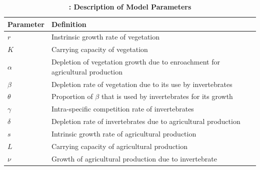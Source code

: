 \documentclass[12pt]{article}
\numberwithin{equation}{section}
\begin{document}
\begin{table}[htp!] \label{Table 1}
	\renewcommand{\arraystretch}{2}
	\caption{\textbf{: Description of Model Parameters}}
	\begin{center}
		\begin{tabular}{|p{2cm}||p{9cm}||p{5cm}|}
        \hline
			\textbf{Parameter} & \textbf{Definition} \\
			\hline
			$r$ & Instrinsic growth rate of vegetation\\
			\hline
			$K$ & Carrying capacity of vegetation\\
			\hline
			${\alpha}$ & Depletion of vegetation growth due to enroachment for agricultural production\\
			\hline
			${\beta}$ & Depletion rate of vegetation due to its use by invertebrates\\
			\hline
			${\theta}$ & Proportion of $\beta$ that is used by invertebrates for its growth\\
		    \hline
			${\gamma}$ & Intra-specific competition rate of invertebrates\\
		    \hline
			${\delta}$ & Depletion rate of invertebrates due to agricultural production\\
		    \hline
			${s}$ & Intrinsic growth rate of agricultural production\\
			\hline
			${L}$ & Carrying capacity of agricultural production\\
			\hline
			${\nu}$ & Growth of agricultural production due to invertebrate\\
			\hline			
		\end{tabular}\label{Table 1}
	\end{center}
\end{table}
			
\end{document}
